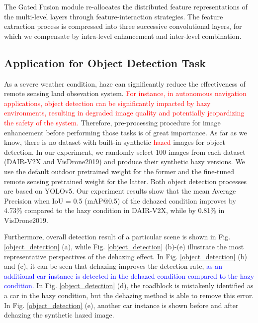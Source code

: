 \documentclass[lettersize,journal]{IEEEtran}
\begin{document}
The Gated Fusion module re-allocates the distributed feature representations of the multi-level layers through feature-interaction strategies. The feature extraction process is compressed into three successive convolutional layers, for which we compensate by intra-level enhancement and inter-level combination.  

\subsection{Application for Object Detection Task}
As a severe weather condition, haze can significantly reduce the effectiveness of remote sensing land obsevation system. \textcolor{red}{For instance, in autonomous navigation applications, object detection can be significantly impacted by hazy environments, resulting in degraded image quality and potentially jeopardizing the safety of the system.} Therefore, pre-processing procedure for image enhancement before performing those tasks is of great importance. As far as we know, there is no dataset with built-in synthetic \textcolor{red}{hazed} images for object detection. In our experiment, we randomly select 100 images from each dataset (DAIR-V2X and VisDrone2019) and produce their synthetic hazy versions. We use the default outdoor pretrained weight for the former and the fine-tuned remote sensing pretrained weight for the latter. Both object detection processes are based on YOLOv5. Our experiment results show that the mean Average Precision when IoU = 0.5 (mAP@0.5) of the dehazed condition improves by 4.73\% compared to the hazy condition in DAIR-V2X, while by 0.81\% in VisDrone2019.

Furthermore, overall detection result of a particular scene is shown in Fig. \ref{object_detection} (a), while Fig. \ref{object_detection} (b)-(e) illustrate the most representative perspectives of the dehazing effect. In Fig. \ref{object_detection} (b) and (c), it can be seen that dehazing improves the detection rate, \textcolor{blue}{as an additional car instance is detected in the dehazed condition compared to the hazy condition.} In Fig. \ref{object_detection} (d), the roadblock is mistakenly identified as a car in the hazy condition, but the dehazing method is able to remove this error. In Fig. \ref{object_detection} (e), another car instance is shown before and after dehazing the synthetic hazed image. 
\end{document}
